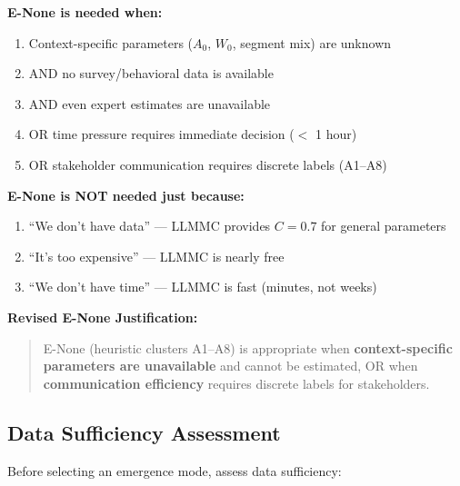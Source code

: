 \begin{tcolorbox}[colback=green!5!white, colframe=green!75!black,
    title=\textbf{Implication: When Is E-None Actually Needed?}]

\textbf{E-None is needed when:}
\begin{enumerate}[nosep]
    \item Context-specific parameters ($A_0$, $W_0$, segment mix) are unknown
    \item AND no survey/behavioral data is available
    \item AND even expert estimates are unavailable
    \item OR time pressure requires immediate decision ($<$ 1 hour)
    \item OR stakeholder communication requires discrete labels (A1--A8)
\end{enumerate}

\textbf{E-None is NOT needed just because:}
\begin{enumerate}[nosep]
    \item[$\times$] ``We don't have data'' --- LLMMC provides $C = 0.7$ for general parameters
    \item[$\times$] ``It's too expensive'' --- LLMMC is nearly free
    \item[$\times$] ``We don't have time'' --- LLMMC is fast (minutes, not weeks)
\end{enumerate}

\textbf{Revised E-None Justification:}
\begin{quote}
E-None (heuristic clusters A1--A8) is appropriate when \textbf{context-specific parameters are unavailable} and cannot be estimated, OR when \textbf{communication efficiency} requires discrete labels for stakeholders.
\end{quote}

\end{tcolorbox}

\subsection{Data Sufficiency Assessment}
\label{sec:ie-data-sufficiency}

Before selecting an emergence mode, assess data sufficiency:

